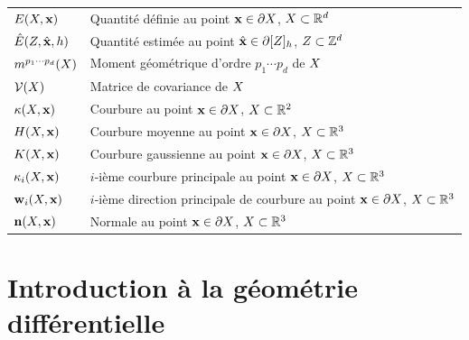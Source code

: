 \begin{table}[ht]
\begin{tabular}{@{}lp{11.5cm}@{}}
    $E(X,\mathbf{x})$                   & Quantité définie au point $\mathbf{x} \in \partial X$, $X \subset \mathbb{R}^d$ \\
    $\hat{E}(Z,\hat{\mathbf{x}},h)$  & Quantité estimée au point $\hat{\mathbf{x}} \in \partial\lbrack Z \rbrack_{h}$, $Z \subset \mathbb{Z}^d$ \\
    $m^{p_1 \cdots p_d}(X)$    & Moment géométrique d'ordre $p_1 \cdots p_d$ de $X$ \\
    $\mathcal{V}(X)$                    & Matrice de covariance de $X$ \\
    $\kappa(X,\mathbf{x})$               & Courbure au point $\mathbf{x} \in \partial X$, $X \subset \mathbb{R}^2$ \\
    $H(X,\mathbf{x})$           & Courbure moyenne au point $\mathbf{x} \in \partial X$, $X \subset \mathbb{R}^3$ \\
    $K(X,\mathbf{x})$          & Courbure gaussienne au point $\mathbf{x} \in \partial X$, $X \subset \mathbb{R}^3$ \\
    $\kappa_{i}(X,\mathbf{x})$       & $i$-ième courbure principale au point $\mathbf{x} \in \partial X$, $X \subset \mathbb{R}^3$ \\
    $\mathbf{w}_{i}(X,\mathbf{x})$        & $i$-ième direction principale de courbure au point $\mathbf{x} \in \partial X$, $X \subset \mathbb{R}^3$ \\
    $\mathbf{n}(X,\mathbf{x})$          & Normale au point $\mathbf{x} \in \partial X$, $X \subset \mathbb{R}^3$ \\
    \bottomrule
  \end{tabular}
\end{table}
%
\section{Introduction à la géométrie différentielle}
\label{sec:geo-diff}

